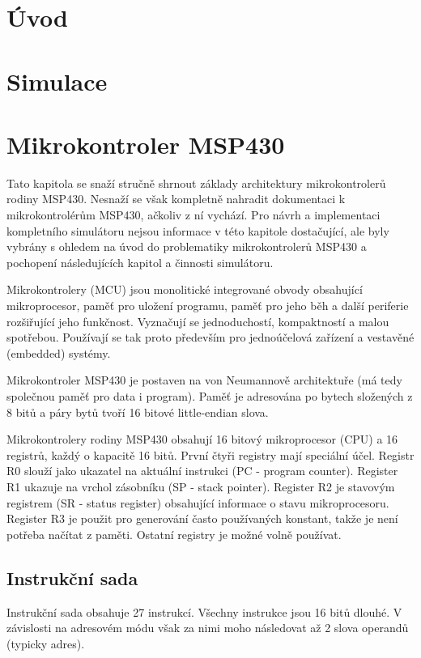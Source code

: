 
\chapter{Úvod}

\chapter{Simulace}

\chapter{Mikrokontroler MSP430}

Tato kapitola se snaží stručně shrnout základy architektury mikrokontrolerů rodiny MSP430. Nesnaží se však kompletně nahradit dokumentaci k mikrokontrolérům
MSP430, ačkoliv z ní vychází. Pro návrh a implementaci kompletního simulátoru nejsou informace v této kapitole dostačující, ale byly vybrány s ohledem na úvod do problematiky mikrokontrolerů MSP430 a pochopení následujících kapitol a činnosti simulátoru.

Mikrokontrolery (MCU) jsou monolitické integrované obvody obsahující mikroprocesor, paměť pro uložení programu, paměť pro jeho běh a další periferie
rozšiřující jeho funkčnost. Vyznačují se jednoduchostí, kompaktností a malou spotřebou. Používají se tak proto především pro jednoúčelová zařízení a 
vestavěné (embedded) systémy.

Mikrokontroler MSP430 je postaven na von Neumannově architektuře (má tedy společnou paměť pro data i program). Paměť je adresována po bytech složených z 8 bitů a páry bytů tvoří 16 bitové little-endian slova.

Mikrokontrolery rodiny MSP430 obsahují 16 bitový mikroprocesor (CPU) a 16 registrů, každý o kapacitě 16 bitů. První čtyři registry mají speciální účel. Registr R0 slouží jako ukazatel na aktuální instrukci (PC - program counter). Register R1 ukazuje na vrchol zásobníku (SP - stack pointer). Register R2 je stavovým registrem (SR - status register) obsahující informace o stavu mikroprocesoru. Register R3 je použit pro generování často používaných konstant, takže je není potřeba načítat z paměti. Ostatní registry je možné volně používat.

\section{Instrukční sada}

Instrukční sada obsahuje 27 instrukcí. Všechny instrukce jsou 16 bitů dlouhé. V závislosti na adresovém módu však za nimi moho následovat až 2 slova operandů (typicky adres).

